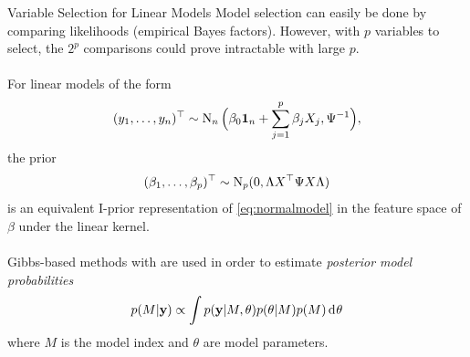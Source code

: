 \documentclass{beamer}
\newlength{\onecolwid}
\begin{document}
\begin{frame}[t]
\begin{columns}[t]
\begin{column}{\onecolwid}
\vspace{1mm}
\begin{block}{Variable Selection for Linear Models}
Model selection can easily be done by comparing likelihoods (empirical Bayes factors). However, with $p$ variables to select, the $2^p$ comparisons could prove intractable with large $p$.
\\~\\[-0.8ex]
For linear models of the form
\[
  (y_1,\dots,y_n)^\top \sim \operatorname{N}_n \Big( \beta_0{\mathbf 1}_n + \sum_{j=1}^p \beta_j X_j, \Psi^{-1} \Big),
\]
\vspace{-8pt}
the prior
\vspace{-8pt}
\[
  (\beta_1,\dots,\beta_p)^\top \sim \operatorname{N}_p(0, \Lambda X^\top \Psi X \Lambda)
\]
is an equivalent I-prior representation of \eqref{eq:normalmodel} in the feature space of $\beta$ under the linear kernel. 
\\~\\[-0.8ex]
Gibbs-based methods with are used in order to estimate \emph{posterior model probabilities}
\[
  p(M | {\mathbf y}) \propto \int p({\mathbf y}|M, \theta) p(\theta|M) p(M) \operatorname{d\!\:\!}\theta
\]
where $M$ is the model index and $\theta$ are model parameters.
\\~\\[-0.8ex]


\end{block}
\end{column}
\end{columns}
\end{frame}
\end{document}

